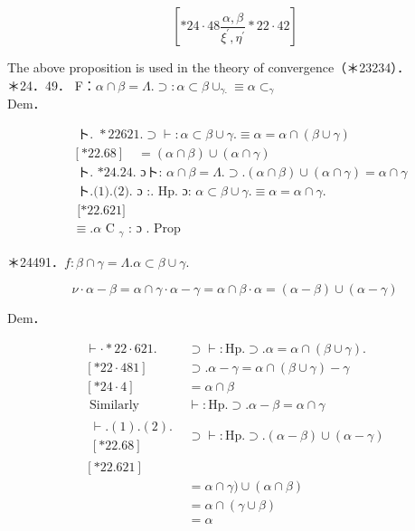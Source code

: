 \documentclass[10pt]{article}
\begin{document}
$$
\left[* 24 \cdot 48 \frac{\alpha, \beta}{\xi^{\prime}, \eta^{\prime}} * 22 \cdot 42\right]
$$

The above proposition is used in the theory of convergence（＊23234）．\\
＊24．49． F：$\alpha \cap \beta=\Lambda . \supset: \alpha \subset \beta \cup_{\gamma .} \equiv \alpha \subset_{\gamma}$\\
Dem．


\begin{align*}
& \text { ト. } * 22621 . \supset \vdash: \alpha \subset \beta \cup \gamma . \equiv \alpha=\alpha \cap(\beta \cup \gamma) \\
& {[* 22.68] \quad=(\alpha \cap \beta) \cup(\alpha \cap \gamma)}  \tag{1}\\
& \text { ト. *24.24. ɔト: } \alpha \cap \beta=\Lambda . \supset .(\alpha \cap \beta) \cup(\alpha \cap \gamma)=\alpha \cap \gamma  \tag{2}\\
& \text { ト.(1).(2). ɔ :. Hp. ɔ: } \alpha \subset \beta \cup \gamma . \equiv \alpha=\alpha \cap \gamma \text {. } \\
& \text { [*22.621] } \\
& \equiv . \alpha \text { C }_{\gamma} \text { : ɔ . Prop }
\end{align*}


＊24491．$f: \beta \cap \gamma=\Lambda . \alpha \subset \beta \cup \gamma$.

$$
\nu \cdot \alpha-\beta=\alpha \cap \gamma \cdot \alpha-\gamma=\alpha \cap \beta \cdot \alpha=(\alpha-\beta) \cup(\alpha-\gamma)
$$

Dem．

\[
\begin{array}{lc}
\vdash \cdot * 22 \cdot 621 . & \supset \vdash: \mathrm{Hp} . \supset . \alpha=\alpha \cap(\beta \cup \gamma) . \\
{[* 22 \cdot 481]} & \supset . \alpha-\gamma=\alpha \cap(\beta \cup \gamma)-\gamma \\
{[* 24 \cdot 4]} & =\alpha \cap \beta \\
\text { Similarly } & \vdash: \mathrm{Hp} . \supset . \alpha-\beta=\alpha \cap \gamma  \tag{2}\\
\begin{array}{l}
\vdash .(1) .(2) . \\
{[* 22.68]}
\end{array} & \supset \vdash: \mathrm{Hp} . \supset .(\alpha-\beta) \cup(\alpha-\gamma) \\
{[* 22.621]} & \\
& =\alpha \cap \gamma) \cup(\alpha \cap \beta) \\
& =\alpha \cap(\gamma \cup \beta) \\
& =\alpha
\end{array}
\]
\end{document}
